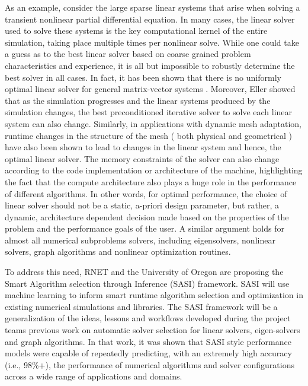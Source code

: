 As an example, consider the large sparse linear systems that arise when solving a transient nonlinear partial differential equation. In many cases, the linear solver used to solve these systems is the key computational kernel of the entire simulation, taking place multiple times per nonlinear solve. While one could take a guess as to the best linear solver based on coarse grained problem characteristics and experience, it is all but impossible to robustly determine the best solver in all cases. In fact, it has been shown that there is no uniformly optimal linear solver for general matrix-vector systems \cite{TODO}. Moreover, Eller \cite{Eller2012} showed that as the simulation progresses and the linear systems produced by the simulation changes, the best preconditioned iterative solver to solve each linear system can also change. Similarly, in applications with dynamic mesh adaptation, runtime changes in the structure of the mesh ( both physical and geometrical ) have also been shown to lead to changes in the linear system and hence, the optimal linear solver. The memory constraints of the solver can also change according to the code implementation or architecture of the machine, highlighting the fact that the compute architecture also plays a huge role in the performance of different algorithms. In other words, for optimal performance, the choice of linear solver should not be a static, a-priori design parameter, but rather, a dynamic, architecture dependent decision made based on the properties of the problem and the performance goals of the user. A similar argument holds for almost all numerical subproblems solvers, including eigensolvers, nonlinear solvers, graph algorithms and nonlinear optimization routines.      

To address this need, RNET and the University of Oregon are proposing the Smart Algorithm selection through Inference (SASI) framework. SASI will use machine learning to inform smart runtime algorithm selection and optimization in existing numerical simulations and libraries. The SASI framework will be a generalization of the ideas, lessons and workflows developed during the project teams previous work on automatic solver selection for linear solvers, eigen-solvers and graph algorithms. In that work, it was shown that SASI style performance models were capable of repeatedly predicting, with an extremely high accuracy (i.e., 98\%+), the performance of numerical algorithms and solver configurations across a wide range of applications and domains.

